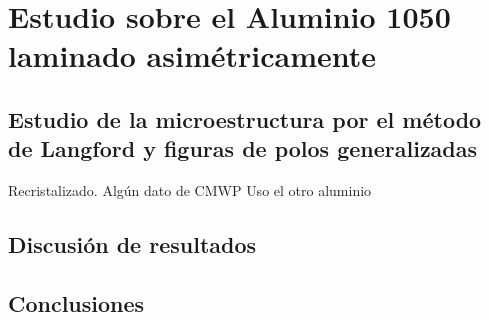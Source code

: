 \chapter{Estudio sobre el Aluminio 1050 laminado asimétricamente}\label{C:AlA}
\graphicspath{{./figs/07_AlA/}}
\section{Estudio de la microestructura por el método de Langford y figuras de polos generalizadas}\label{S:AlALANG}
Recristalizado. Algún dato de CMWP
Uso el otro aluminio

\section{Discusión de resultados}\label{S:AlDis}
\section{Conclusiones}\label{S:AlConclusiones}
